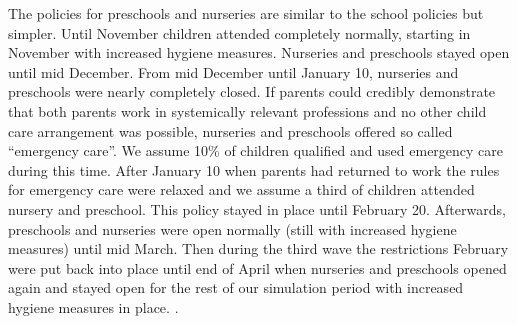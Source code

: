 The policies for preschools and nurseries are similar to the school policies but simpler.
Until November children attended completely normally, starting in November with increased
hygiene measures. Nurseries and preschools stayed open until mid December. From mid
December until January 10, nurseries and preschools were nearly completely closed. If
parents could credibly demonstrate that both parents work in systemically relevant
professions and no other child care arrangement was possible, nurseries and preschools
offered so called ``emergency care''. We assume 10\% of children qualified and used
emergency care during this time. After January 10 when parents had returned to work the
rules for emergency care were relaxed and we assume a third of children attended nursery
and preschool. This policy stayed in place until February 20. Afterwards, preschools and
nurseries were open normally (still with increased hygiene measures) until mid March.
Then during the third wave the restrictions February were put back into place until end
of April when nurseries and preschools opened again and stayed open for the rest of our
simulation period with increased hygiene measures in place. \citep{KiTa_BY, KiTa_NRW,
KiTa_BW, KiTa_BWa, KiTa_BYa, schoolBWb}.
